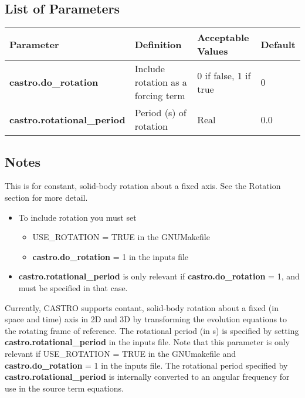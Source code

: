 
\subsection{List of Parameters}

\begin{table*}[h]
\begin{scriptsize}
\begin{center}
\begin{tabular}{|l|l|l|l|}\hline
Parameter & Definition & Acceptable Values & Default\\
\hline
{\bf castro.do\_rotation} & Include rotation as a forcing term & 0 if false, 1 if true & 0 \\
{\bf castro.rotational\_period} & Period (s) of rotation & Real & 0.0 \\
\hline
\end{tabular}
\end{center}
\end{scriptsize}
\end{table*}

\subsection{Notes}
This is for constant, solid-body rotation about a fixed axis.  See the Rotation section for more detail.
\begin{itemize}
\item To include rotation you must set
\begin{itemize}
\item USE\_ROTATION = TRUE in the GNUMakefile
\item {\bf castro.do\_rotation} = 1 in the inputs file
\end{itemize}
\item {\bf castro.rotational\_period} is only relevant if {\bf castro.do\_rotation} = 1, and must be specified in that case.
\end{itemize}

Currently, CASTRO supports contant, solid-body rotation about a fixed
(in space and time) axis in 2D and 3D by transforming the evolution
equations to the rotating frame of reference.  The rotational
period (in s) is specified by setting {\bf
  castro.rotational\_period} in the inputs file.  Note that this
parameter is only relevant if USE\_ROTATION = TRUE in the GNUmakefile
and {\bf castro.do\_rotation} = 1 in the inputs file.  The rotational
period specified by {\bf castro.rotational\_period} is internally
converted to an angular frequency for use in the source term
equations.

